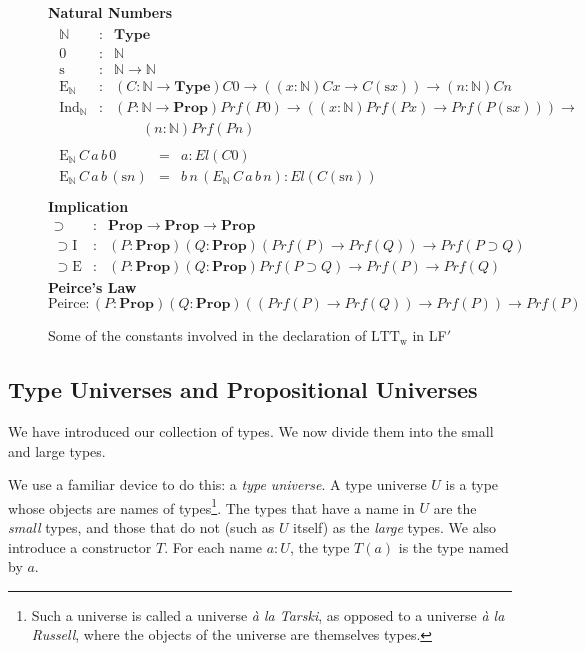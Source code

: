 \documentclass[acmtocl]{acmtrans2m}
\newcommand{\LTTW}{\ensuremath{\mathrm{LTT}_\mathrm{w}}}
\newcommand{\El}[1]{El \left( {#1} \right)}
\newcommand{\Type}{\mathbf{Type}}
\newcommand{\Prop}{\mathbf{Prop}}
\newcommand{\Prf}[1]{Prf \left( {#1} \right)}
\newcommand{\s}{\mathrm{s}}
\newcommand{\EN}{\mathrm{E}_\mathbb{N}}
\newcommand{\IN}{\mathrm{Ind}_\mathbb{N}}
\newcommand{\LF}{LF$'$}
\begin{document}
\begin{figure}[top]
\textbf{Natural Numbers}
\begin{gather*}
\begin{array}{rcl}
\mathbb{N} & : & \Type \\
0 & : & \mathbb{N} \\
\s & : & \mathbb{N} \rightarrow \mathbb{N} \\
\EN & : & (C : \mathbb{N} \rightarrow \Type) C 0 \rightarrow ((x : \mathbb{N}) C x \rightarrow  C (\s x)) \rightarrow (n : \mathbb{N}) C n \\
\IN & : & (P : \mathbb{N} \rightarrow \Prop) \Prf {P 0} \rightarrow((x : \mathbb{N})
\Prf {P x} \rightarrow \Prf{P (\s x)}) \rightarrow \\
& & \qquad (n : \mathbb{N}) \Prf {P n}
\end{array} \\
\begin{array}{rcl}
\EN\, C\, a\, b\, 0 & = & a : \El{C 0} \\
\EN\, C\, a\, b\, (\s n) & = & b\, n\, (E_\mathbb{N}\, C\, a\, b\, n) : \El{C (\s n)} \\
\end{array}
\end{gather*}
\textbf{Implication}
\begin{eqnarray*}
\supset & : & \Prop \rightarrow \Prop \rightarrow \Prop \\
\supset \! \mathrm{I} & : & (P : \Prop) (Q : \Prop) (\Prf{P} \rightarrow \Prf{Q}) \rightarrow \Prf{P \supset Q} \\
\supset \! \mathrm{E} & : & (P : \Prop) (Q : \Prop) \Prf{P \supset Q} \rightarrow \Prf{P} \rightarrow \Prf{Q}
\end{eqnarray*}
\textbf{Peirce's Law}
\[ \mathrm{Peirce} : (P : \Prop) (Q : \Prop) ((\Prf{P} \rightarrow \Prf{Q}) \rightarrow \Prf{P}) \rightarrow \Prf{P} \]
\caption{Some of the constants involved in the declaration of $\LTTW$ in \LF} \label{fig:ltt}
\end{figure}


\subsection{Type Universes and Propositional Universes}

We have introduced our collection of types.  We now divide them into
the small and large types.

We use a familiar device to do this: a \emph{type universe}. A type universe $U$
is a type whose objects are names of types\footnote{Such a universe is called a universe \emph{\`a la Tarski}, as opposed to a universe \emph{\`a la Russell}, where the objects of the universe are themselves types.}.  The types that have a name in $U$ are the
\emph{small} types, and those that do not (such as $U$ itself) as the
\emph{large} types. We also introduce a constructor $T$.
For each name $a : U$, the type $T(a)$ is the type named by $a$.
\end{document}
